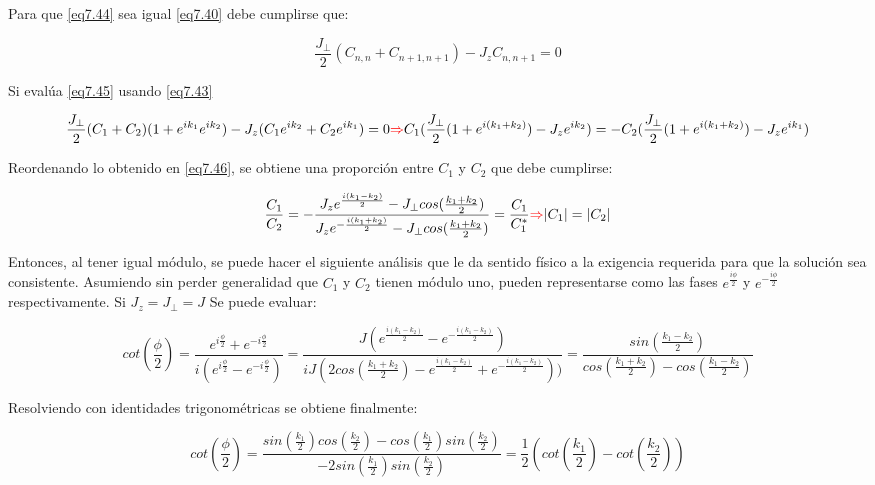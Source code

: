 \documentclass{book}
\begin{document}
Para que \ref{eq7.44} sea igual \ref{eq7.40} debe cumplirse que:

\begin{equation}\label{eq7.45}\frac{J_\perp}{2}(C_{n,n}+C_{n+1,n+1})-J_zC_{n,n+1}=0\end{equation}

Si evalúa \ref{eq7.45} usando \ref{eq7.43}

\begin{equation}\label{eq7.46}\frac{J_\perp}{2}(C_1+C_2)(1+e^{ik_1}e^{ik_2})-J_z(C_1e^{ik_2}+C_2e^{ik_1})=0\textcolor{red}{\Rightarrow}C_1(\frac{J_\perp}{2}(1+e^{i(k_1+k_2)})-J_ze^{ik_2})=-C_2(\frac{J_\perp}{2}(1+e^{i(k_1+k_2)})-J_ze^{ik_1})\end{equation}

Reordenando lo obtenido en \ref{eq7.46}, se obtiene una proporción entre $C_1$ y $C_2$ que debe cumplirse:

\begin{equation}\label{eq7.47} \frac{C_1}{C_2}=-\frac{J_ze^{\frac{i(k_1-k_2)}{2}}-J_\perp cos(\frac{k_1+k_2}{2})}{J_ze^{-\frac{i(k_1+k_2)}{2}}-J_\perp cos(\frac{k_1+k_2}{2})}=\frac{C_1}{C_1^*}\textcolor{red}{\Rightarrow} \lvert C_1\rvert = \lvert C_2\rvert \end{equation}

Entonces, al tener igual módulo, se puede hacer el siguiente análisis que le da sentido físico a la exigencia requerida para que la solución sea consistente. Asumiendo sin perder generalidad que $C_1$ y $C_2$ tienen módulo uno, pueden representarse como las fases $e^{\frac{i\phi}{2}}$ y $e^{-\frac{i\phi}{2}}$ respectivamente. Si $J_z=J_\perp=J$ Se puede evaluar:

\begin{equation}\label{eq7.48}cot(\frac{\phi}{2})=\frac{e^{i\frac{\phi}{2}}+e^{-i\frac{\phi}{2}}}{i(e^{i\frac{\phi}{2}}-e^{-i\frac{\phi}{2}})}=\frac{J(e^{\frac{i(k_1-k_2)}{2}}-e^{-\frac{i(k_1-k_2)}{2}})}{iJ(2cos(\frac{k_1+k_2}{2})-e^{\frac{i(k_1-k_2)}{2}}+e^{-\frac{i(k_1-k_2)}{2}}))}=\frac{sin(\frac{k_1-k_2}{2})}{cos(\frac{k_1+k_2}{2})-cos(\frac{k_1-k_2}{2})}\end{equation}

Resolviendo con identidades trigonométricas se obtiene finalmente:

\begin{equation}\label{eq7.49}cot(\frac{\phi}{2})=\frac{sin(\frac{k_1}{2})cos(\frac{k_2}{2})-cos(\frac{k_1}{2})sin(\frac{k_2}{2})}{-2sin(\frac{k_1}{2})sin(\frac{k_2}{2})}=\frac{1}{2}(cot(\frac{k_1}{2})-cot(\frac{k_2}{2}))\end{equation}
\end{document}
